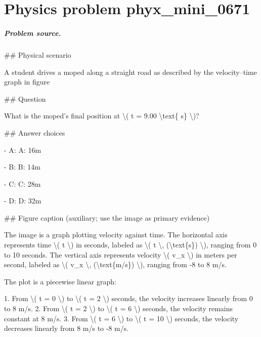 
\chapter{Physics problem phyx\_mini\_0671}
\label{ch:PhyXMiniProblems_problem_phyx_mini_0671}

\paragraph{Problem source.}
\#\# Physical scenario

A student drives a moped along a straight road as described by the velocity--time graph in figure

\#\# Question

What is the moped's final position at \textbackslash{}( t = 9.00 \textbackslash{}text\{ s\} \textbackslash{})?

\#\# Answer choices

- A: A: 16m

- B: B: 14m

- C: C: 28m

- D: D: 32m

\#\# Figure caption (auxiliary; use the image as primary evidence)

The image is a graph plotting velocity against time. The horizontal axis represents time \textbackslash{}( t \textbackslash{}) in seconds, labeled as \textbackslash{}( t \textbackslash{}, (\textbackslash{}text\{s\}) \textbackslash{}), ranging from 0 to 10 seconds. The vertical axis represents velocity \textbackslash{}( v\_x \textbackslash{}) in meters per second, labeled as \textbackslash{}( v\_x \textbackslash{}, (\textbackslash{}text\{m/s\}) \textbackslash{}), ranging from -8 to 8 m/s.

The plot is a piecewise linear graph:

1. From \textbackslash{}( t = 0 \textbackslash{}) to \textbackslash{}( t = 2 \textbackslash{}) seconds, the velocity increases linearly from 0 to 8 m/s.
2. From \textbackslash{}( t = 2 \textbackslash{}) to \textbackslash{}( t = 6 \textbackslash{}) seconds, the velocity remains constant at 8 m/s.
3. From \textbackslash{}( t = 6 \textbackslash{}) to \textbackslash{}( t = 10 \textbackslash{}) seconds, the velocity decreases linearly from 8 m/s to -8 m/s.

